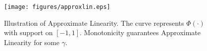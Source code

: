 \begin{figure}[t]
\centering
\texttt{[image: figures/approxlin.eps]}
\vspace{-0.2in}
\caption{Illustration of Approximate Linearity. The curve represents $\Phi(\cdot)$ with support on $[-1, 1]$.  Monotonicity guarantees Approximate Linearity for some $\gamma$.}
\label{fig:al}
\vskip -0.2in
\end{figure}





